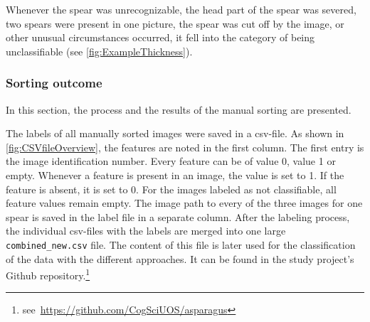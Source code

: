 Whenever the spear was unrecognizable, the head part of the spear was severed, two spears were present in one picture, the spear was cut off by the image, or other unusual circumstances occurred, it fell into the category of being unclassifiable (see \autoref{fig:ExampleThickness}).


\subsubsection{Sorting outcome}
\label{subsec:SortingOutcome}

In this section, the process and the results of the manual sorting are presented.

The labels of all manually sorted images were saved in a csv-file. As shown in \autoref{fig:CSVfileOverview}, the features are noted in the first column. The first entry is the image identification number. Every feature can be of value 0, value 1 or empty. Whenever a feature is present in an image, the value is set to 1. If the feature is absent, it is set to 0. For the images labeled as not classifiable, all feature values remain empty. The image path to every of the three images for one spear is saved in the label file in a separate column. After the labeling process, the individual csv-files with the labels are merged into one large \texttt{combined\_new.csv} file. The content of this file is later used for the classification of the data with the different approaches. It can be found in the study project’s Github repository.\footnote{see~\url{https://github.com/CogSciUOS/asparagus}}

\begin{table}[!hb]
	\centering
	\vspace{10pt}
	\caption[Manual Labeling Feature Representation]{\textbf{Feature Representation in the Data Set} \\ In this table, the representation of each feature in the manually labeled 13319 asparagus samples is reported in \%.}
	\label{tab:FeatureRepresentation}
\end{table}

